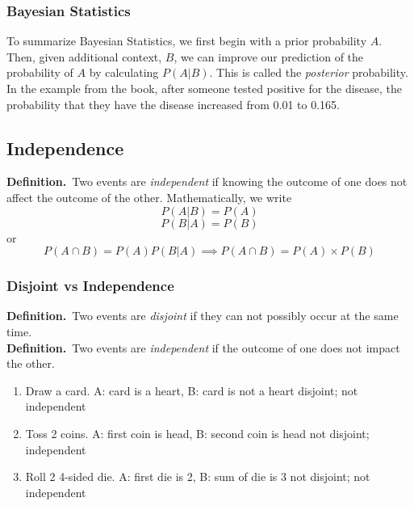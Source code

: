 \documentclass{report}
\newcommand{\dfn}[1]{\textbf{Definition.}\ #1 }
\begin{document}
            \subsubsection{Bayesian Statistics}  %
                To summarize Bayesian Statistics, we first begin with a prior probability $A$. Then, given additional context, $B$, we can improve our prediction of the probability of $A$ by calculating $P(A\vert B)$. This is called the \emph{posterior} probability. In the example from the book, after someone tested positive for the disease, the probability that they have the disease increased from 0.01 to 0.165.
        \subsection{Independence}  %
            \dfn{Two events are \emph{independent} if knowing the outcome of one does not affect the outcome of the other. Mathematically, we write}
            \begin{equation} P(A\vert B)=P(A) \end{equation}
            \begin{equation} P(B\vert A)=P(B) \end{equation}
            or
            \begin{equation} P(A\cap B)=P(A)P(B\vert A)\implies P(A\cap B)=P(A)\times P(B) \end{equation}
            \subsubsection{Disjoint vs Independence}  %
                \dfn{Two events are \emph{disjoint} if they can not possibly occur at the same time.} \\
                \dfn{Two events are \emph{independent} if the outcome of one does not impact the other.}
                \begin{enumerate}
                    \item Draw a card. A: card is a heart, B: card is not a heart
                    \subitem disjoint; not independent
                    \item Toss 2 coins. A: first coin is head, B: second coin is head
                    \subitem not disjoint; independent
                    \item Roll 2 4-sided die. A: first die is 2, B: sum of die is 3
                    \subitem not disjoint; not independent
                \end{enumerate}
\end{document}
